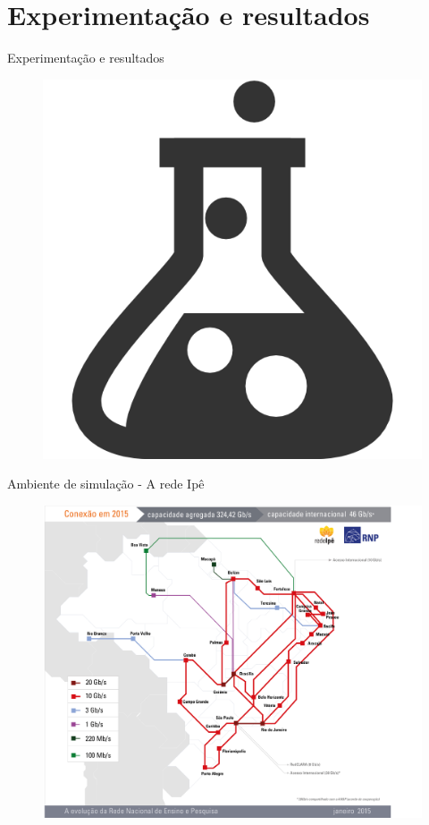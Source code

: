 \section{Experimentação e resultados}

\begin{frame}{Experimentação e resultados}
    \begin{figure}[!htb]
        \centering
        \includegraphics[scale=6]{images/test-tube}
    \end{figure}

\end{frame}


\begin{frame}{Ambiente de simulação - A rede Ipê}

    \begin{figure}[!htb]
        \centering
        \includegraphics[scale=.15]{images/ipe-network-2015}
    \end{figure}

\end{frame}


